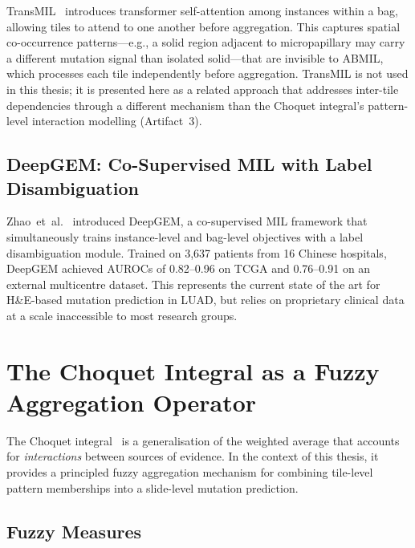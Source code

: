 TransMIL~\cite{shao2021transmil} introduces transformer self-attention among instances within a bag, allowing tiles to attend to one another before aggregation.
This captures spatial co-occurrence patterns---e.g., a solid region adjacent to micropapillary may carry a different mutation signal than isolated solid---that are invisible to ABMIL, which processes each tile independently before aggregation.
TransMIL is not used in this thesis; it is presented here as a related approach that addresses inter-tile dependencies through a different mechanism than the Choquet integral's pattern-level interaction modelling (Artifact~3).

\subsection{DeepGEM: Co-Supervised MIL with Label Disambiguation}
\label{sec:bg:deepgem}

Zhao~et~al.~\cite{zhao2025deepgem} introduced DeepGEM, a co-supervised MIL framework that simultaneously trains instance-level and bag-level objectives with a label disambiguation module.
Trained on 3,637 patients from 16 Chinese hospitals, DeepGEM achieved AUROCs of 0.82--0.96 on TCGA and 0.76--0.91 on an external multicentre dataset.
This represents the current state of the art for H\&E-based mutation prediction in LUAD, but relies on proprietary clinical data at a scale inaccessible to most research groups.


\section{The Choquet Integral as a Fuzzy Aggregation Operator}
\label{sec:bg:choquet}

The Choquet integral~\cite{choquet1954theory,grabisch2000choquet} is a generalisation of the weighted average that accounts for \emph{interactions} between sources of evidence.
In the context of this thesis, it provides a principled fuzzy aggregation mechanism for combining tile-level pattern memberships into a slide-level mutation prediction.

\subsection{Fuzzy Measures}
\label{sec:bg:choquet:measures}

